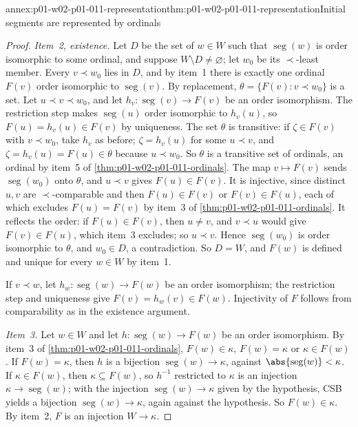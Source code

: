 \begin{annexitem}{annex:p01-w02-p01-011-representation}{thm:p01-w02-p01-011-representation}{Initial segments are represented by ordinals}
\begin{proof}
\emph{Item~2, existence.} Let \(D\) be the set of \(w\in W\) such that
\(\operatorname{seg}(w)\) is order isomorphic to some ordinal, and suppose
\(W\setminus D\ne\varnothing\); let \(w_0\) be its \(\prec\)-least member.
Every \(v\prec w_0\) lies in \(D\), and by item~1 there is exactly one
ordinal \(F(v)\) order isomorphic to \(\operatorname{seg}(v)\). By
replacement, \(\theta=\{F(v):v\prec w_0\}\) is a set. Let
\(u\prec v\prec w_0\), and let \(h_v:\operatorname{seg}(v)\to F(v)\) be an
order isomorphism. The restriction step makes \(\operatorname{seg}(u)\)
order isomorphic to \(h_v(u)\), so \(F(u)=h_v(u)\in F(v)\) by uniqueness.
The set \(\theta\) is transitive: if \(\zeta\in F(v)\) with \(v\prec w_0\),
take \(h_v\) as before; \(\zeta=h_v(u)\) for some \(u\prec v\), and
\(\zeta=h_v(u)=F(u)\in\theta\) because \(u\prec w_0\). So \(\theta\) is a
transitive set of ordinals, an ordinal by item~5 of
\cref{thm:p01-w02-p01-011-ordinals}. The map \(v\mapsto F(v)\) sends
\(\operatorname{seg}(w_0)\) onto \(\theta\), and \(u\prec v\) gives
\(F(u)\in F(v)\). It is injective, since distinct \(u,v\) are
\(\prec\)-comparable and then \(F(u)\in F(v)\) or \(F(v)\in F(u)\), each of
which excludes \(F(u)=F(v)\) by item~3 of
\cref{thm:p01-w02-p01-011-ordinals}. It reflects the order: if
\(F(u)\in F(v)\), then \(u\ne v\), and \(v\prec u\) would give
\(F(v)\in F(u)\), which item~3 excludes; so \(u\prec v\). Hence
\(\operatorname{seg}(w_0)\) is order isomorphic to \(\theta\), and
\(w_0\in D\), a contradiction. So \(D=W\), and \(F(w)\) is defined and
unique for every \(w\in W\) by item~1.

If \(v\prec w\), let \(h_w:\operatorname{seg}(w)\to F(w)\) be an order
isomorphism; the restriction step and uniqueness give
\(F(v)=h_w(v)\in F(w)\). Injectivity of \(F\) follows from comparability as
in the existence argument.

\emph{Item~3.} Let \(w\in W\) and let \(h:\operatorname{seg}(w)\to F(w)\) be
an order isomorphism. By item~3 of \cref{thm:p01-w02-p01-011-ordinals},
\(F(w)\in\kappa\), \(F(w)=\kappa\) or \(\kappa\in F(w)\). If
\(F(w)=\kappa\), then \(h\) is a bijection
\(\operatorname{seg}(w)\to\kappa\), against
\(\abs{\operatorname{seg}(w)}<\kappa\). If \(\kappa\in F(w)\), then
\(\kappa\subseteq F(w)\), so \(h^{-1}\) restricted to \(\kappa\) is an
injection \(\kappa\to\operatorname{seg}(w)\); with the injection
\(\operatorname{seg}(w)\to\kappa\) given by the hypothesis, CSB yields a
bijection \(\operatorname{seg}(w)\to\kappa\), again against the hypothesis.
So \(F(w)\in\kappa\). By item~2, \(F\) is an injection \(W\to\kappa\).
\end{proof}
\end{annexitem}

